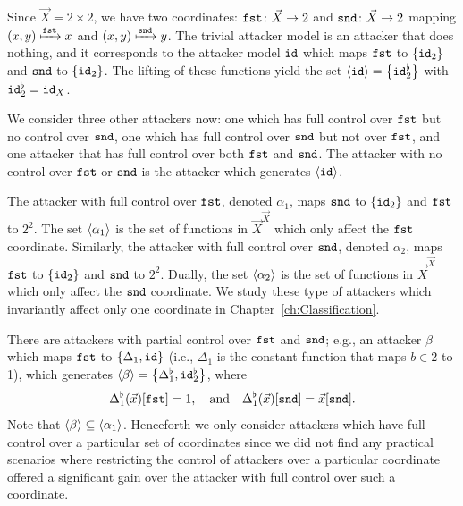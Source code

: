 \begin{example}
\label{ex:Latent:ExampleAttacker}
    Since $\vec{X}=2\times 2$, we have two coordinates: $\mathtt{\texttt{fst}}\colon \vec{X}\rightarrow 2$ and $\mathtt{\texttt{snd}}\colon \vec{X}\rightarrow 2$ mapping $(x,y)\xmapsto{\mathtt{\texttt{fst}}}x$ and $(x,y)\xmapsto{\mathtt{\texttt{snd}}}y$. The trivial attacker model is an attacker that does nothing, and it corresponds to the attacker model ${\texttt{id}}$ which maps $\mathtt{\texttt{fst}}$ to $\left\{{\texttt{id}}_2\right\}$ and $\mathtt{\texttt{snd}}$ to $\left\{{\texttt{id}}_2\right\}$. The lifting of these functions yield the set ${{\left<{\texttt{id}}\right>}}=\left\{{\texttt{id}}_{2}^\flat\right\}$ with ${\texttt{id}}_{2}^\flat={\texttt{id}}_X$.

    We consider three other attackers now: one which has full control over $\mathtt{\texttt{fst}}$ but no control over $\mathtt{\texttt{snd}}$, one which has full control over $\mathtt{\texttt{snd}}$ but not over $\mathtt{\texttt{fst}}$, and one attacker that has full control over both $\mathtt{\texttt{fst}}$ and $\mathtt{\texttt{snd}}$. The attacker with no control over $\mathtt{\texttt{fst}}$ or $\mathtt{\texttt{snd}}$ is the attacker which generates ${{\left<{\texttt{id}}\right>}}$. 

    The attacker with full control over $\mathtt{\texttt{fst}}$, denoted $\alpha_1$, maps $\mathtt{\texttt{snd}}$ to $\left\{{\texttt{id}}_2\right\}$ and $\mathtt{\texttt{fst}}$ to $2^2$. The set ${{\left<\alpha_1\right>}}$ is the set of functions in $\vec{X}^{\vec{X}}$ which only affect the $\mathtt{\texttt{fst}}$ coordinate. Similarly, the attacker with full control over $\mathtt{\texttt{snd}}$, denoted $\alpha_2$, maps $\mathtt{\texttt{fst}}$ to $\left\{{\texttt{id}}_2\right\}$ and $\mathtt{\texttt{snd}}$ to $2^2$. Dually, the set ${{\left<\alpha_2\right>}}$ is the set of functions in $\vec{X}^{\vec{X}}$ which only affect the $\mathtt{\texttt{snd}}$ coordinate. We study these type of attackers which invariantly affect only one coordinate in Chapter~\ref{ch:Classification}. 

    There are attackers with partial control over $\mathtt{\texttt{fst}}$ and $\mathtt{\texttt{snd}}$; e.g., an attacker $\beta$ which maps $\mathtt{\texttt{fst}}$ to $\left\{\Delta_1, {\texttt{id}}\right\}$ (i.e., $\Delta_1$ is the constant function that maps $b\in 2$ to 1), which generates ${{\left<\beta\right>}}=\left\{\Delta^\flat_1, {\texttt{id}}_2^\flat\right\}$, where
    \begin{align*}
        \Delta^\flat_1(\vec{x})[\mathtt{\texttt{fst}}]=1,\quad\text{and}\quad \Delta^\flat_1(\vec{x})[\mathtt{\texttt{snd}}]=\vec{x}[\mathtt{\texttt{snd}}].
    \end{align*}
    Note that ${{\left<\beta\right>}}\subseteq{{\left<\alpha_1\right>}}$. Henceforth we only consider attackers which have full control over a particular set of coordinates since we did not find any practical scenarios where restricting the control of attackers over a particular coordinate offered a significant gain over the attacker with full control over such a coordinate.


\end{example}
